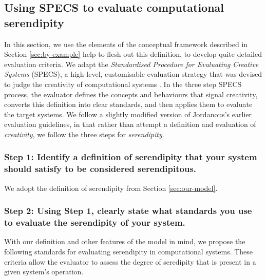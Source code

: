 \subsection{Using SPECS to evaluate computational serendipity}\label{specs-overview}

In this section, we use the elements of the conceptual framework
described in Section \ref{sec:by-example} help to flesh out this
definition, to develop quite detailed evaluation criteria.
We adapt the \emph{Standardised Procedure for Evaluating Creative Systems} (SPECS),
a high-level, customisable evaluation strategy that was devised to judge the creativity
of computational systems \cite{jordanous:12}.  
%
In the three step SPECS process, the evaluator defines the concepts
and behaviours that signal creativity, converts this definition into
clear standards, and then applies them to evaluate the target systems.
%
We follow a slightly modified version of Jordanous's earlier evaluation
guidelines, in that rather than attempt a definition and evaluation of
{\em creativity}, we follow the three steps for \emph{serendipity}.

\subsubsection*{Step 1: Identify a definition of serendipity that your system should satisfy to be considered serendipitous.}

\noindent We adopt the definition of serendipity from Section
\ref{sec:our-model}.

\subsubsection*{Step 2: Using Step 1, clearly state what standards you use to evaluate the serendipity of your system.}

\noindent With our definition and other features of the model in mind, we propose the following standards for evaluating serendipity in computational systems. These criteria allow the evaluator to assess the degree of seredipity that is present in a given system's operation.


